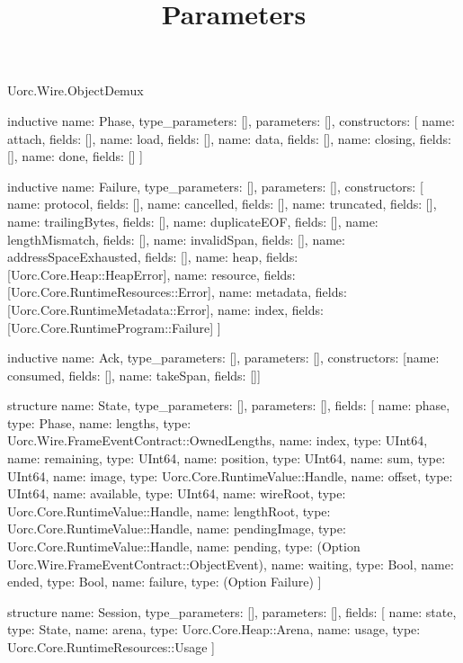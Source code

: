 \begin{lexlean}{Uorc.Wire.ObjectDemux}
\title{Parameters}
\begin{semanticmodule}
inductive{
  name: Phase,
  type_parameters: [],
  parameters: [],
  constructors: [
    {name: attach, fields: []},
    {name: load, fields: []},
    {name: data, fields: []},
    {name: closing, fields: []},
    {name: done, fields: []}
  ]
}

inductive{
  name: Failure,
  type_parameters: [],
  parameters: [],
  constructors: [
    {name: protocol, fields: []},
    {name: cancelled, fields: []},
    {name: truncated, fields: []},
    {name: trailingBytes, fields: []},
    {name: duplicateEOF, fields: []},
    {name: lengthMismatch, fields: []},
    {name: invalidSpan, fields: []},
    {name: addressSpaceExhausted, fields: []},
    {name: heap, fields: [Uorc.Core.Heap::HeapError]},
    {name: resource, fields: [Uorc.Core.RuntimeResources::Error]},
    {name: metadata, fields: [Uorc.Core.RuntimeMetadata::Error]},
    {name: index, fields: [Uorc.Core.RuntimeProgram::Failure]}
  ]
}

inductive{
  name: Ack,
  type_parameters: [],
  parameters: [],
  constructors: [{name: consumed, fields: []}, {name: takeSpan, fields: []}]
}

structure{
  name: State,
  type_parameters: [],
  parameters: [],
  fields: [
    {name: phase, type: Phase},
    {name: lengths, type: Uorc.Wire.FrameEventContract::OwnedLengths},
    {name: index, type: UInt64},
    {name: remaining, type: UInt64},
    {name: position, type: UInt64},
    {name: sum, type: UInt64},
    {name: image, type: Uorc.Core.RuntimeValue::Handle},
    {name: offset, type: UInt64},
    {name: available, type: UInt64},
    {name: wireRoot, type: Uorc.Core.RuntimeValue::Handle},
    {name: lengthRoot, type: Uorc.Core.RuntimeValue::Handle},
    {name: pendingImage, type: Uorc.Core.RuntimeValue::Handle},
    {name: pending, type: (Option Uorc.Wire.FrameEventContract::ObjectEvent)},
    {name: waiting, type: Bool},
    {name: ended, type: Bool},
    {name: failure, type: (Option Failure)}
  ]
}

structure{
  name: Session,
  type_parameters: [],
  parameters: [],
  fields: [
    {name: state, type: State},
    {name: arena, type: Uorc.Core.Heap::Arena},
    {name: usage, type: Uorc.Core.RuntimeResources::Usage}
  ]
}


\end{semanticmodule}
\end{lexlean}
